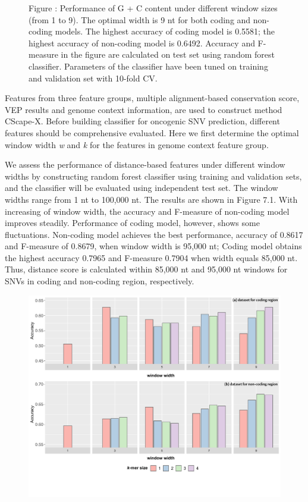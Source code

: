 \documentclass[a4paper,nohyper,nobib,openany,justified]{tufte-book}
\begin{document}
\begin{fullwidth}
\begin{figure}[b!]
  \smallskip\noindent\small Figure \thefigure:
Performance of G + C content under different window sizes (from 1 to 9). The optimal width is 9 nt for both coding and non-coding models. The highest accuracy of coding model is 0.5581; the highest accuracy of non-coding model is 0.6492. Accuracy and F-measure in the figure are calculated on test set using random forest classifier. Parameters of the classifier have been tuned on training and validation set with 10-fold CV. %
  \label{fig:gc}%
\end{figure}

Features from three feature groups, multiple alignment-based conservation score, VEP results and genome context information, are used to construct method CScape-X. Before building classifier for oncogenic SNV prediction, different features should be comprehensive evaluated. Here we first determine the optimal window width \emph{w} and \emph{k} for the features in genome context feature group.

We assess the performance of distance-based features under different window widths by constructing random forest classifier using training and validation sets, and the classifier will be evaluated using independent test set. The window widths range from 1 nt to 100,000 nt. The results are shown in Figure 7.1. With increasing of window width, the accuracy and F-measure of non-coding model improves steadily. Performance of coding model, however, shows some fluctuations. Non-coding model achieves the best performance, accuracy of 0.8617 and F-measure of 0.8679, when window width is 95,000 nt; Coding model obtains the highest accuracy 0.7965 and F-measure 0.7904 when width equals 85,000 nt. Thus, distance score is calculated within 85,000 nt and 95,000 nt windows for SNVs in coding and non-coding region, respectively.

\begin{figure}[t]
  \includegraphics[width=\linewidth]{perf_spectrum_num.pdf}%


\end{figure}
\end{fullwidth}
\end{document}
